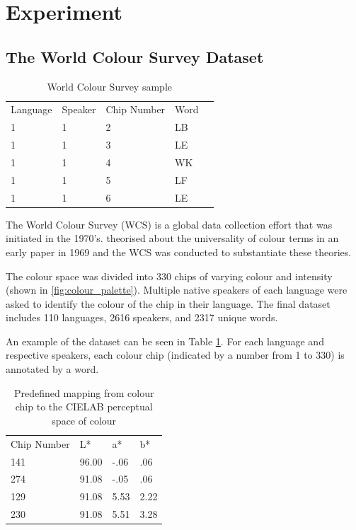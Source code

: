 \documentclass[11pt]{article}
\begin{document}
\section{Experiment}
\label{sec:experiment}

\subsection{The World Colour Survey Dataset}
\label{ssec:color_dataset}

\begin{table}[h]
\begin{tabular}{lllll}
Language & Speaker & Chip Number & Word &  \\
1        & 1       & 2    & LB   &  \\
1        & 1       & 3    & LE   &  \\
1        & 1       & 4    & WK   &  \\
1        & 1       & 5    & LF   &  \\
1        & 1       & 6    & LE   & 
\end{tabular}
\caption{World Colour Survey sample}
\label{table:raw_data}
\end{table}

The World Colour Survey (WCS) \cite{berlin1991basic} is a global data collection effort that was initiated in the 1970's.
\citet{merrifield1971} theorised about the universality of colour terms in an early paper in 1969 and the WCS was conducted to substantiate these theories.

The colour space was divided into 330 chips of varying colour and intensity (shown in \ref{fig:colour_palette}). 
Multiple native speakers of each language were asked to identify the colour of the chip in their language.
The final dataset includes 110 languages, 2616 speakers, and 2317 unique words.  

An example of the dataset can be seen in Table \ref{table:raw_data}. 
For each language and respective speakers, each colour chip (indicated by a number from 1 to 330) is annotated by a word. 

\begin{table}[h]
\begin{tabular}{llll}
Chip Number & L*    & a*   & b*   \\
141  & 96.00 & -.06 & .06  \\
274  & 91.08 & -.05 & .06  \\
129  & 91.08 & 5.53 & 2.22 \\
230  & 91.08 & 5.51 & 3.28
\end{tabular}
\caption{Predefined mapping from colour chip to the CIELAB perceptual space of colour}
\label{table:lab_values}
\end{table}
\end{document}
